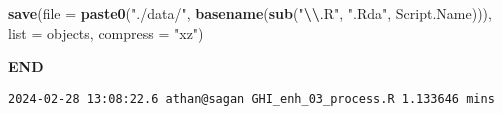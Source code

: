 \documentclass[
  10pt,
  a4paper,oneside]{article}
\newenvironment{Shaded}{\begin{snugshade}}{\end{snugshade}}
\newcommand{\AttributeTok}[1]{\textcolor[rgb]{0.13,0.29,0.53}{#1}}
\newcommand{\FunctionTok}[1]{\textcolor[rgb]{0.13,0.29,0.53}{\textbf{#1}}}
\newcommand{\NormalTok}[1]{#1}
\newcommand{\SpecialCharTok}[1]{\textcolor[rgb]{0.81,0.36,0.00}{\textbf{#1}}}
\newcommand{\StringTok}[1]{\textcolor[rgb]{0.31,0.60,0.02}{#1}}
\begin{document}
\begin{Shaded}
\begin{Highlighting}[]
\FunctionTok{save}\NormalTok{(}\AttributeTok{file =} \FunctionTok{paste0}\NormalTok{(}\StringTok{"./data/"}\NormalTok{, }\FunctionTok{basename}\NormalTok{(}\FunctionTok{sub}\NormalTok{(}\StringTok{"}\SpecialCharTok{\textbackslash{}\textbackslash{}}\StringTok{.R"}\NormalTok{, }\StringTok{".Rda"}\NormalTok{, Script.Name))),}
     \AttributeTok{list =}\NormalTok{ objects,}
     \AttributeTok{compress =} \StringTok{"xz"}\NormalTok{)}
\end{Highlighting}
\end{Shaded}

\textbf{END}

\begin{verbatim}
2024-02-28 13:08:22.6 athan@sagan GHI_enh_03_process.R 1.133646 mins
\end{verbatim}
\end{document}
